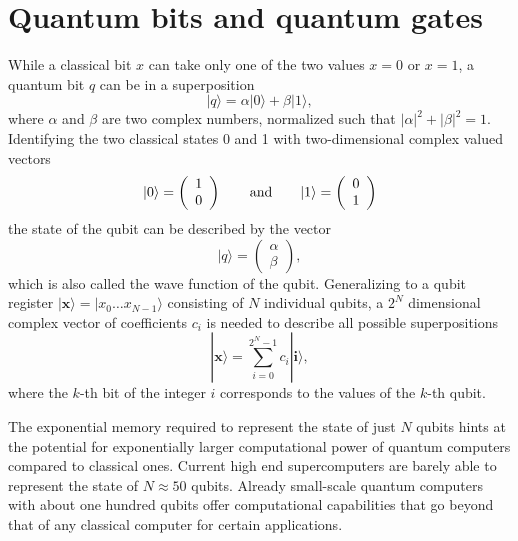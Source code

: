 \documentclass[journal]{IEEEtran}
\begin{document}
\appendices
\section{Quantum bits and quantum gates}
\label{sec:box1}
While a classical bit $x$ can take only one of the two values $x=0$ or $x=1$, a quantum bit $q$ can be in a superposition
\begin{equation}
|q\rangle = \alpha |0\rangle +\beta|1\rangle,
\end{equation}
where $\alpha$ and $\beta$ are two complex numbers, normalized such that
$|\alpha|^2+|\beta|^2=1$. Identifying the two classical states 0 and 1 with two-dimensional complex valued vectors 
 \begin{equation}
 |0\rangle = \left(\begin{array}{c}1\\0\end{array}\right) \qquad {\rm and} \qquad  |1\rangle = \left(\begin{array}{c}0\\1\end{array}\right)
 \end{equation}
  the state of the qubit can be described by the vector 
  \begin{equation}
  |q\rangle = \left(\begin{array}{c}\alpha\\\beta\end{array}\right),
  \end{equation} which is also called the wave function of the qubit. Generalizing to a qubit register $| \mathbf{x}\rangle=|x_0\ldots x_{N-1}\rangle$ consisting of $N$ individual qubits, a $2^N$ dimensional complex vector of coefficients $c_i$ is needed to describe all possible superpositions
  \begin{equation}
  |\mathbf{x}\rangle = \sum_{i=0}^{2^N-1} c_i |\mathbf{i}\rangle,
  \end{equation}
where the $k$-th bit of the integer $i$ corresponds to the values of the $k$-th qubit.

The exponential memory required to represent the state of just $N$ qubits hints at the potential for exponentially larger computational power of quantum computers compared to classical ones. Current high end supercomputers are barely able to represent the state of $N\approx50$ qubits. %
Already small-scale quantum computers with about one hundred qubits offer computational capabilities that go beyond that of any classical computer for certain applications.
\end{document}
